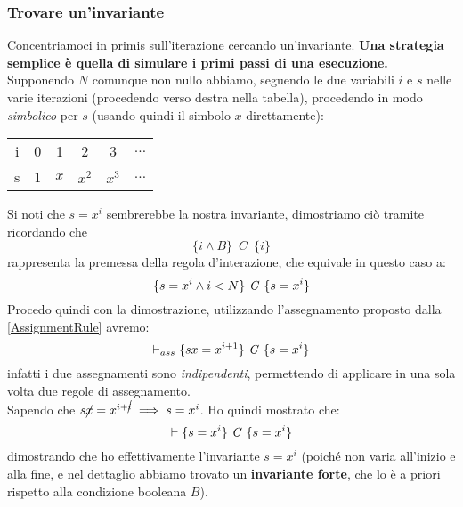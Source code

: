 \begin{esempio}
				      			\subsubsection{Trovare un'invariante}
				      			Concentriamoci in primis sull'iterazione cercando un'invariante. \textbf{Una strategia
				      			semplice è quella di simulare i primi passi di una esecuzione.} Supponendo $N$
				      			comunque non nullo abbiamo, seguendo le due variabili $i$ e $s$ nelle varie
				      			iterazioni (procedendo verso destra nella tabella), procedendo in modo
				      			\textit{simbolico} per $s$ (usando quindi il simbolo $x$ direttamente):
				      			\begin{table}[H]
				      				\centering
				      				\begin{tabular}[H]{c|ccccc}
				      					i & 0 & 1   & 2     & 3     & $\ldots$ \\
				      					s & 1 & $x$ & $x^2$ & $x^3$ & $\ldots$ 
				      				\end{tabular}
				      			\end{table}
				      			Si noti che $s= x^i$ sembrerebbe la nostra invariante, dimostriamo ciò tramite ricordando che 
				      			\[\{i\land B\}\,\,\,C\,\,\,\{i\}\] rappresenta la premessa della regola d'interazione, che equivale in questo caso a:
				      			\[\{s=x^i\land i<N\}\mbox{ \textit{C} }\{s=x^i\}\]
				      			Procedo quindi con la dimostrazione, utilizzando l'assegnamento proposto dalla \ref{AssignmentRule} avremo:
				      			\[\vdash_{ass}\{sx=x^{i+1}\}\mbox{ \textit{C} }\{s=x^i\}\]
				      			infatti i due assegnamenti sono \emph{indipendenti}, permettendo di applicare
				      			in una sola volta due regole di assegnamento.\\
				      			Sapendo che $s\cancel{x}=x^{i+\cancel{i}}\implies s=x^i$. Ho quindi mostrato
				      			che:
				      			\[\vdash \{s=x^i\}\mbox{ \textit{C} }\{s=x^i\}\]
				      			dimostrando che ho effettivamente l'invariante $s= x^i$ (poiché non varia all'inizio e alla fine, e nel dettaglio
				      			abbiamo trovato un \textbf{invariante forte}, che lo è a priori rispetto alla
				      			condizione booleana $B$).\\
				      			  

\end{esempio}
